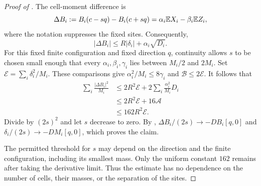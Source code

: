 \begin{proof}[Proof of ]
The cell-moment difference is
\[
  \Delta B_i:=B_i(c-sq)-B_i(c+sq)
       =\alpha_i\mathbb E X_i-\beta_i\mathbb E Z_i,
\]
where the notation suppresses the fixed sites. Consequently,
\[
  |\Delta B_i|
  \le R|\delta_i|+\alpha_i\sqrt{D_i}.
\]
For this fixed finite configuration and fixed direction $q$, continuity
allows $s$ to be chosen small enough that every
$\alpha_i,\beta_i,\gamma_i$ lies between $M_i/2$ and $2M_i$.
Set $\mathcal E=\sum_i\delta_i^2/M_i$. These comparisons give
$\alpha_i^2/M_i\le8\gamma_i$ and $\mathcal B\le2\mathcal E$.
It follows that
\begin{align*}
  \sum_i\frac{|\Delta B_i|^2}{M_i}
  &\le2R^2\mathcal E+2\sum_i\frac{\alpha_i^2}{M_i}D_i\\
  &\le2R^2\mathcal E+16\mathcal A\\
  &\le162R^2\mathcal E.
\end{align*}
Divide by $(2s)^2$ and let $s$ decrease to zero.
By ,
$\Delta B_i/(2s)\to-D B_i[q,0]$ and
$\delta_i/(2s)\to-D M_i[q,0]$, which proves the claim.

The permitted threshold for $s$ may depend on the direction and the
finite configuration, including its smallest mass. Only the uniform
constant $162$ remains after taking the derivative limit. Thus the
estimate has no dependence on the number of cells, their masses, or
the separation of the sites.
\end{proof}
